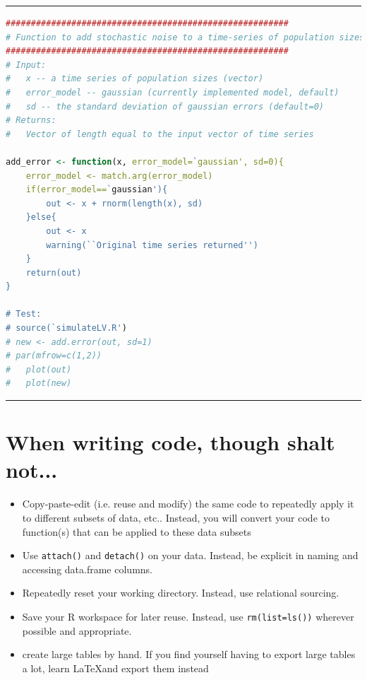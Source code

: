\documentclass[12pt,letterpaper]{article}
\begin{document}
\noindent\rule{12cm}{0.4pt}
\begin{lstlisting}[language=R]
########################################################
# Function to add stochastic noise to a time-series of population sizes.
########################################################
# Input:
#	x -- a time series of population sizes (vector)
#	error_model -- gaussian (currently implemented model, default)
# 	sd -- the standard deviation of gaussian errors (default=0)
# Returns:
#	Vector of length equal to the input vector of time series

add_error <- function(x, error_model=`gaussian', sd=0){
	error_model <- match.arg(error_model)
	if(error_model==`gaussian'){
		out <- x + rnorm(length(x), sd)
	}else{
		out <- x
		warning(``Original time series returned'')
	}
	return(out)
}

# Test:
# source(`simulateLV.R')
# new <- add.error(out, sd=1)
# par(mfrow=c(1,2))
#	plot(out)
#	plot(new)
\end{lstlisting}
\noindent\rule{12cm}{0.4pt}


\section{When writing code, though shalt not...}

\begin{itemize}
\item Copy-paste-edit (i.e. reuse and modify) the same code to repeatedly apply it to different subsets of data, etc..  Instead, you will convert your code to function(s) that can be applied to these data subsets
\item Use \texttt{attach()} and \texttt{detach()} on your data.  Instead, be explicit in naming and accessing data.frame columns.
\item Repeatedly reset your working directory.  Instead, use relational sourcing.
\item Save your \textsf{R} workspace for later reuse.  Instead, use \texttt{rm(list=ls())} wherever possible and appropriate.
\item create large tables by hand. If you find yourself having to export large tables a lot, learn \LaTeX and export them instead
\end{itemize}
\end{document}
